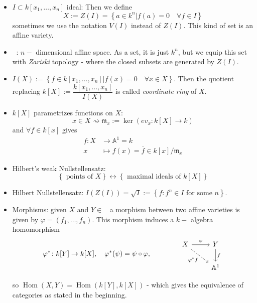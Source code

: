 \documentclass[12pt]{article} %
\DeclareMathOperator{\Aff}{\mathbb{A}^n}
\DeclareMathOperator{\Hom}{Hom}
\begin{document}
\begin{itemize}
      \item $I \subset k[x_1,\ldots,x_n]$ ideal: Then we define \[X:=Z(I) = \left\lbrace a \in k^n| f(a) =0 \quad\forall f \in I\right\rbrace\]
            sometimes we use the notation $V(I)$ instead of $Z(I)$. This kind of set is an affine variety.
      \item $\Aff$: $n-$ dimensional affine space. As a set, it is just $k^n$, but we equip this set with
            \textit{Zariski} topology - where the closed subsets are generated by $Z(I)$.
      \item $I(X):=\left\lbrace f \in k[x_1,\ldots,x_n]| f(x) =0 \quad \forall x \in X\right\rbrace$. Then the quotient replacing
            $k[X]:= \dfrac{k[x_1,\ldots,x_n]}{I(X)}$ is called \textit{coordinate ring} of $X$.
      \item $k[X]$ parametrizes functions on $X$:
            \[x \in X \rightsquigarrow \mathfrak{m}_x:=\ker(ev_x: k[X] \to k)\]
            and $\forall f \in k[x]$ gives
            \begin{align*}
                  f \colon X & \to \mathbb{A}^1 = k                                \\
                  x          & \mapsto f(x) = \overline{f} \in k[x]/\mathfrak{m}_x
            \end{align*}
      \item Hilbert's weak Nullstellensatz:
            \[\left\lbrace\text{ points of } X\right\rbrace \leftrightarrow \left\lbrace \text{ maximal ideals of }k[X]\right\rbrace\]
      \item Hilbert Nullstellensatz: $I(Z(I))=\sqrt{I}:=\left\lbrace f: f^n \in I \text{ for some } n\right\rbrace$.
      \item Morphisms: given $X$ and $Y \in \Aff$ a morphism between two affine varieties is given by
            $\varphi=(f_1,\ldots,f_n)$. This morphism induces a $k-$ algebra homomorphism
            \[\varphi^* \colon k[Y] \to k[X],\quad \varphi^*(\psi) = \psi \circ \varphi, \qquad \qquad
                  \begin{tikzcd}
                        X \arrow[r, "\varphi"] \arrow[dr, dashrightarrow, "\varphi^*f",swap] & Y \arrow[d, "f"]\\ & \mathbb{A}^1 \end{tikzcd}\]

            so $\Hom(X,Y) = \Hom(k[Y], k[X])$ - which gives the equivalence of categories as stated in the beginning.
\end{itemize}
\end{document}
